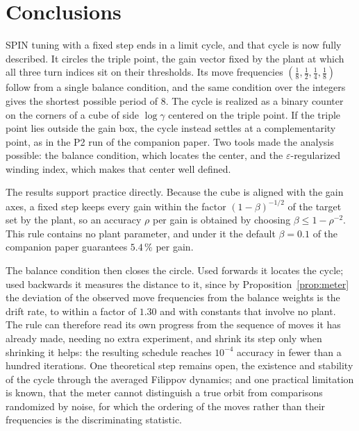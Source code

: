 \documentclass[letterpaper, 10pt, conference, twocolumn]{ieeeconf}
\begin{document}
\section{Conclusions}

SPIN tuning with a fixed step ends in a limit cycle, and that cycle is now
fully described. It circles the triple point, the gain vector fixed by the
plant at which all three turn indices sit on their thresholds. Its move
frequencies $(\tfrac18, \tfrac12, \tfrac14, \tfrac18)$ follow from a single
balance condition, and the same condition over the integers gives the shortest
possible period of $8$. The cycle is realized as a binary counter on the
corners of a cube of side $\log\gamma$ centered on the triple point. If the
triple point lies outside the gain box, the cycle instead settles at a
complementarity point, as in the P2 run of the companion paper. Two tools made
the analysis possible: the balance condition, which locates the center, and the
$\varepsilon$-regularized winding index, which makes that center well defined.

The results support practice directly. Because the cube is aligned with the
gain axes, a fixed step keeps every gain within the factor $(1-\beta)^{-1/2}$
of the target set by the plant, so an accuracy $\rho$ per gain is obtained by
choosing $\beta \le 1-\rho^{-2}$. This rule contains no plant parameter, and
under it the default $\beta = 0.1$ of the companion paper guarantees
$5.4\,\%$ per gain.

The balance condition then closes the circle. Used forwards it locates the
cycle; used backwards it measures the distance to it, since by
Proposition~\ref{prop:meter} the deviation of the observed move frequencies
from the balance weights is the drift rate, to within a factor of $1.30$ and
with constants that involve no plant. The rule can therefore read its own
progress from the sequence of moves it has already made, needing no extra
experiment, and shrink its step only when shrinking it helps: the resulting
schedule reaches $10^{-4}$ accuracy in fewer than a hundred iterations. One
theoretical step remains open, the existence and stability of the cycle
through the averaged Filippov dynamics; and one practical limitation is known,
that the meter cannot distinguish a true orbit from comparisons randomized by
noise, for which the ordering of the moves rather than their frequencies is
the discriminating statistic.
\end{document}
